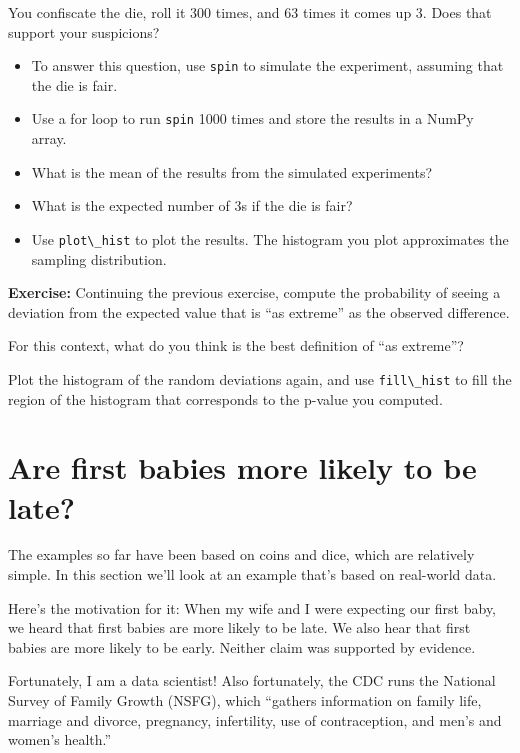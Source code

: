 You confiscate the die, roll it 300 times, and 63 times it comes up 3.
Does that support your suspicions?

\begin{itemize}
\item
  To answer this question, use \passthrough{\lstinline!spin!} to
  simulate the experiment, assuming that the die is fair.
\item
  Use a for loop to run \passthrough{\lstinline!spin!} 1000 times and
  store the results in a NumPy array.
\item
  What is the mean of the results from the simulated experiments?
\item
  What is the expected number of 3s if the die is fair?
\item
  Use \passthrough{\lstinline!plot\_hist!} to plot the results. The
  histogram you plot approximates the sampling distribution.
\end{itemize}

\textbf{Exercise:} Continuing the previous exercise, compute the
probability of seeing a deviation from the expected value that is ``as
extreme'' as the observed difference.

For this context, what do you think is the best definition of ``as
extreme''?

Plot the histogram of the random deviations again, and use
\passthrough{\lstinline!fill\_hist!} to fill the region of the histogram
that corresponds to the p-value you computed.

\hypertarget{are-first-babies-more-likely-to-be-late}{%
\section{Are first babies more likely to be
late?}\label{are-first-babies-more-likely-to-be-late}}

The examples so far have been based on coins and dice, which are
relatively simple. In this section we'll look at an example that's based
on real-world data.

Here's the motivation for it: When my wife and I were expecting our
first baby, we heard that first babies are more likely to be late. We
also hear that first babies are more likely to be early. Neither claim
was supported by evidence.

Fortunately, I am a data scientist! Also fortunately, the CDC runs the
National Survey of Family Growth (NSFG), which ``gathers information on
family life, marriage and divorce, pregnancy, infertility, use of
contraception, and men's and women's health.''

